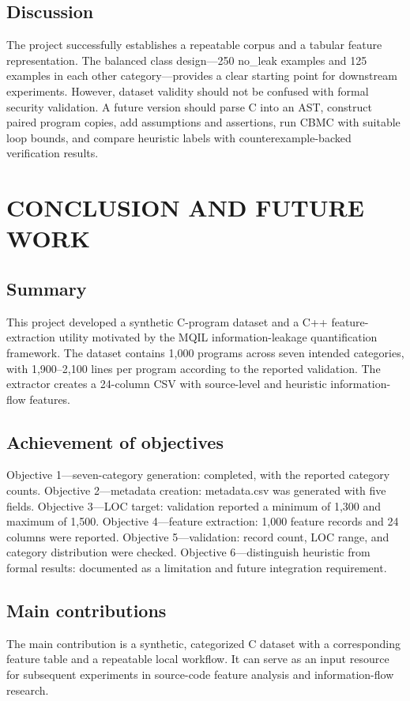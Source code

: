 \documentclass[12pt,a4paper,oneside]{report}
\begin{document}
\section{Discussion}
The project successfully establishes a repeatable corpus and a tabular feature representation. The balanced class design---250 no\_leak examples and 125 examples in each other category---provides a clear starting point for downstream experiments. However, dataset validity should not be confused with formal security validation. A future version should parse C into an AST, construct paired program copies, add assumptions and assertions, run CBMC with suitable loop bounds, and compare heuristic labels with counterexample-backed verification results.\par

\chapter{CONCLUSION AND FUTURE WORK}

\section{Summary}
This project developed a synthetic C-program dataset and a C++ feature-extraction utility motivated by the MQIL information-leakage quantification framework. The dataset contains 1,000 programs across seven intended categories, with 1,900--2,100 lines per program according to the reported validation. The extractor creates a 24-column CSV with source-level and heuristic information-flow features.\par

\section{Achievement of objectives}
Objective 1---seven-category generation: completed, with the reported category counts. Objective 2---metadata creation: metadata.csv was generated with five fields. Objective 3---LOC target: validation reported a minimum of 1,300 and maximum of 1,500. Objective 4---feature extraction: 1,000 feature records and 24 columns were reported. Objective 5---validation: record count, LOC range, and category distribution were checked. Objective 6---distinguish heuristic from formal results: documented as a limitation and future integration requirement.\par

\section{Main contributions}
The main contribution is a synthetic, categorized C dataset with a corresponding feature table and a repeatable local workflow. It can serve as an input resource for subsequent experiments in source-code feature analysis and information-flow research.\par
\end{document}
